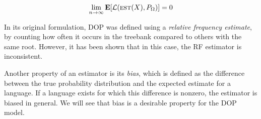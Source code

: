 $$\lim_{n \to \infty} \mathbf{E}[\mathcal{L}(\textsc{est}(X), P_\Omega)] = 0 $$


In its original formulation, DOP was defined using a \emph{relative frequency estimate}, by counting how often it occurs in the treebank compared to others with the same root. However, it has been shown \cite{johnson2002} that in this case, the RF estimator is inconsistent.

Another property of an estimator is its \emph{bias}, which is defined as the difference between the true probability distribution and the expected estimate for a language. If a language exists for which this difference is nonzero, the estimator is biased in general. We will see that bias is a desirable property for the DOP model.


